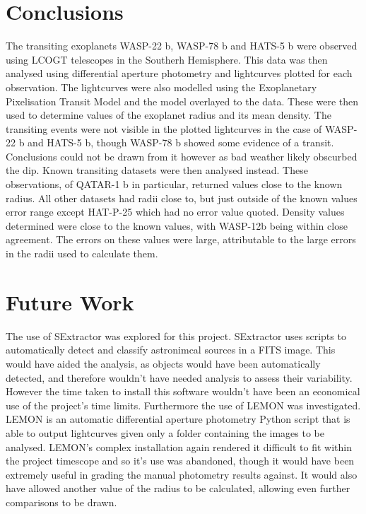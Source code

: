 \documentclass{report}
\begin{document}

\section{Conclusions}
The transiting exoplanets WASP-22 b, WASP-78 b and HATS-5 b were observed using LCOGT telescopes in the Southerh Hemisphere. This data was then analysed using differential aperture photometry and lightcurves plotted for each observation. The lightcurves were also modelled using the Exoplanetary Pixelisation Transit Model and the model overlayed to the data. These were then used to determine values of the exoplanet radius and its mean density. The transiting events were not visible in the plotted lightcurves in the case of WASP-22 b and HATS-5 b, though WASP-78 b showed some evidence of a transit. Conclusions could not be drawn from it however as bad weather likely obscurbed the dip. Known transiting datasets were then analysed instead. These observations, of QATAR-1 b in particular, returned values close to the known radius. All other datasets had radii close to, but just outside of the known values error range except HAT-P-25 which had no error value quoted. Density values determined were close to the known values, with WASP-12b being within close agreement. The errors on these values were large, attributable to the large errors in the radii used to calculate them. 


\section{Future Work}
The use of SExtractor \parencite{sextractor} was explored for this project. SExtractor uses scripts to automatically detect and classify astronimcal sources in a FITS image. This would have aided the analysis, as objects would have been automatically detected, and therefore wouldn't have needed analysis to assess their variability. However the time taken to install this software wouldn't have been an economical use of the project's time limits. Furthermore the use of LEMON \parencite{lemon} was investigated. LEMON is an automatic differential aperture photometry Python script that is able to output lightcurves given only a folder containing the images to be analysed. LEMON's complex installation again rendered it difficult to fit within the project timescope and so it's use was abandoned, though it would have been extremely useful in grading the manual photometry results against. It would also have allowed another value of the radius to be calculated, allowing even further comparisons to be drawn. 
\end{document}
